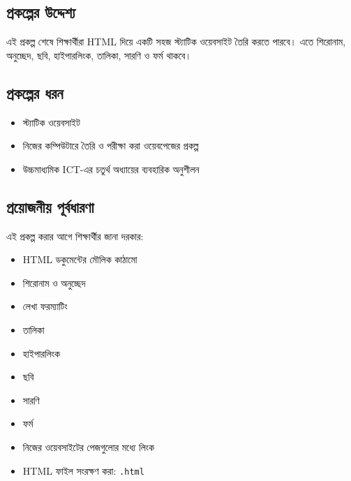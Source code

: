 \subsection{প্রকল্পের উদ্দেশ্য}

এই প্রকল্প শেষে শিক্ষার্থীরা HTML দিয়ে একটি সহজ স্ট্যাটিক ওয়েবসাইট তৈরি করতে পারবে। এতে শিরোনাম, অনুচ্ছেদ, ছবি, হাইপারলিংক, তালিকা, সারণি ও ফর্ম থাকবে।

\subsection{প্রকল্পের ধরন}

\begin{itemize}
\item স্ট্যাটিক ওয়েবসাইট
\item নিজের কম্পিউটারে তৈরি ও পরীক্ষা করা ওয়েবপেজের প্রকল্প
\item উচ্চমাধ্যমিক ICT-এর চতুর্থ অধ্যায়ের ব্যবহারিক অনুশীলন
\end{itemize}

\subsection{প্রয়োজনীয় পূর্বধারণা}

এই প্রকল্প করার আগে শিক্ষার্থীর জানা দরকার:
\par\noindent
\begin{minipage}[t]{.48\linewidth}\vspace{0pt}
\begin{itemize}
\item HTML ডকুমেন্টের মৌলিক কাঠামো
\item শিরোনাম ও অনুচ্ছেদ
\item লেখা ফরম্যাটিং
\item তালিকা
\item হাইপারলিংক
\end{itemize}
\end{minipage}\hfill
\begin{minipage}[t]{.48\linewidth}\vspace{0pt}
\begin{itemize}
\item ছবি
\item সারণি
\item ফর্ম
\item নিজের ওয়েবসাইটের পেজগুলোর মধ্যে লিংক
\item HTML ফাইল সংরক্ষণ করা: \texttt{.html}
\end{itemize}
\end{minipage}\par


